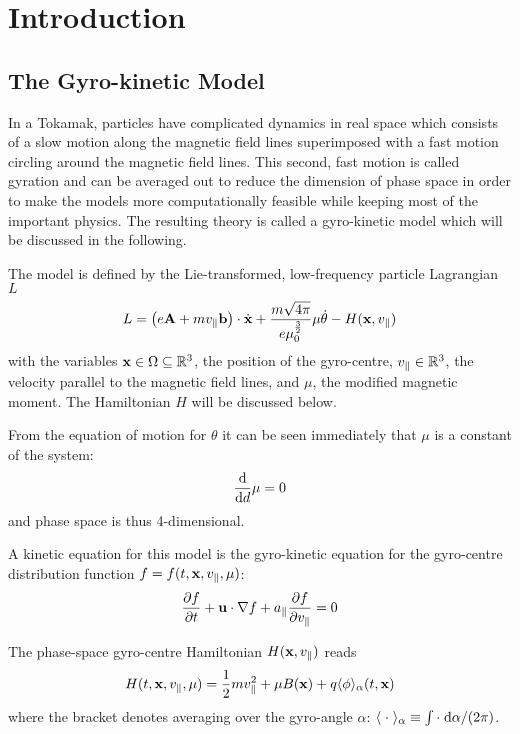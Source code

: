 
\section{Introduction}
\label{sec:introduction}
\subsection{The Gyro-kinetic Model}

In a Tokamak, particles have complicated dynamics in real space which consists of a slow motion along the magnetic field lines superimposed with a fast motion circling around the magnetic field lines. This second, fast motion is called gyration and can be averaged out to reduce the dimension of phase space in order to make the models more computationally feasible while keeping most of the important physics. The resulting theory is called a gyro-kinetic model which will be discussed in the following.

The model is defined by the Lie-transformed, low-frequency particle Lagrangian $L$ \cite{Bottino_Sonnendrucker_2015}
\begin{equation}\label{Lagrangian}
	L = \left(e\mathbf{A} + m v_\parallel \mathbf{b} \right)\cdot\dot{\mathbf{x}} + \frac{m\sqrt{4\pi}}{e \mu_0^{\frac{3}{2}}} \mu \dot{\theta} - H(\mathbf{x}, v_\parallel)
\end{equation}
with the variables $\mathbf{x} \in \Omega \subseteq \mathbb{R}^3$, the position of the gyro-centre, $v_\parallel \in \mathbb{R}^3$, the velocity parallel to the magnetic field lines, and $\mu$, the modified magnetic moment. The Hamiltonian $H$ will be discussed below.

From the equation of motion for $\theta$ it can be seen immediately that $\mu$ is a constant of the system:
\begin{equation}
	\frac{\text{d} }{\text{d} d} \mu = 0
\end{equation}
and phase space is thus 4-dimensional.

A kinetic equation for this model is the gyro-kinetic equation for the gyro-centre distribution function $f=f(t,\mathbf{x}, v_\parallel, \mu)$:
\begin{equation}\label{drift-kinetic model}
	\frac{\partial f}{\partial t} + \mathbf{u} \cdot \nabla f + a_\parallel \frac{\partial f}{\partial v_\parallel} = 0
\end{equation}

The phase-space gyro-centre Hamiltonian $H(\mathbf{x}, v_\parallel)$ reads
\begin{equation}
	H(t, \mathbf{x}, v_\parallel, \mu) = \frac{1}{2} m v_\parallel^2 + \mu B(\mathbf{x}) + q \langle \phi \rangle_\alpha (t,\mathbf{x})
\end{equation}
where the bracket denotes averaging over the gyro-angle $\alpha$: $\langle \;\cdot\; \rangle_\alpha \equiv \int \cdot\;\text{d} \alpha / (2\pi)$.

